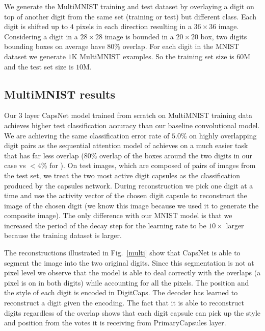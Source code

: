 \documentclass{article}
\begin{document}
We generate the MultiMNIST training and test dataset by overlaying a digit on top of another digit from the same set (training or test) but different class. Each digit is shifted up to $4$ pixels in each direction resulting in a $36\times36$ image. Considering a digit in a $28\times28$ image is bounded in a $20\times20$ box, two digits bounding boxes on average have $80$\% overlap.  For each digit in the MNIST dataset we generate $1$K MultiMNIST examples. So the training set size is $60$M and the test set size is $10$M.
\subsection{MultiMNIST results}
Our $3$ layer CapsNet model trained from scratch on MultiMNIST training data achieves higher test classification accuracy than our baseline convolutional model. We are achieving the same classification error rate of $5.0$\% on highly overlapping digit pairs as the sequential attention model of \cite{ba} achieves on a much easier task that has far less overlap ($80$\% overlap of the boxes around the two digits in our case vs $<4$\% for \cite{ba}). On test images, which are composed of pairs of images from the test set, we treat the two most active digit capsules as the classification produced by the capsules network. During reconstruction we pick one digit at a time and use the activity vector of the chosen digit capsule to reconstruct the image of the chosen digit (we know this image because we used it to generate the composite image). The only difference with our MNIST model is that we increased the period of the decay step for the learning rate to be $10\times$ larger because the training dataset is larger.

The reconstructions illustrated in Fig.~\ref{multi} show that CapsNet is able to segment the image into the two original digits. Since this segmentation is not at pixel level we observe that the model is able to deal correctly with the overlaps (a pixel is on in both digits) while accounting for all the pixels. The position and the style of each digit is encoded in DigitCaps. The decoder has learned to reconstruct a digit given the encoding. The fact that it is able to reconstruct digits regardless of the overlap shows that each digit capsule can pick up the style and position from the votes it is receiving from PrimaryCapsules layer.
\end{document}
